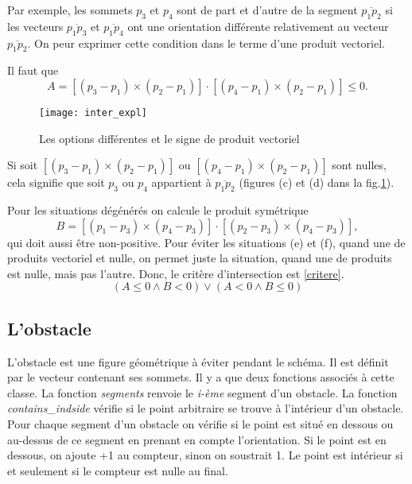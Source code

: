 \documentclass[12pt]{article}
\begin{document}
	Par exemple, les sommets $p_3$ et $p_4$ sont de part et d'autre de la segment $\overline{p_1p_2}$ si les vecteurs  $\overline{p_1p_3}$ et $\overline{p_1p_4}$ ont une orientation différente relativement au vecteur $\overline{p_1p_2}$. On peur exprimer cette condition dans le terme d'une produit vectoriel.
	
	Il faut que 
	\begin{equation}
	A = [(p_3 - p_1) \times (p_2 - p_1)]\cdot[(p_4 - p_1) \times (p_2 - p_1)] \leq 0.
	\end{equation}
	\begin{figure}
		\centering
		\texttt{[image: inter\_expl]}
		\caption{Les options différentes et le signe de produit vectoriel}
		\label{intersect_expl}
	\end{figure}
	
	Si soit  $[(p_3 - p_1) \times (p_2 - p_1)]$ ou $[(p_4 - p_1) \times (p_2 - p_1)]$ sont nulles, cela signifie que soit $p_3$ ou $p_4$ appartient à $\overline{p_1p_2}$ (figures (c) et (d) dans la fig.\ref{intersect_expl}).
	
	Pour les situations dégénérés on calcule le produit symétrique
	\begin{equation}
	B = [(p_1 - p_3) \times (p_4 - p_3)]\cdot[(p_2 - p_3) \times (p_4 - p_3)],
	\end{equation}
	qui doit aussi être non-positive.
	Pour éviter les situations (e) et (f), quand une de produits vectoriel et nulle, on permet juste la situation, quand une de produits est nulle, mais pas l'autre. Donc, le critère d'intersection est \eqref{critere}.
	\begin{equation}
	\label {critere}
	(A \leq 0 \wedge B <0) \vee (A < 0 \wedge B \leq 0) 
	\end{equation}
	\subsection{L'obstacle}
	L'obstacle est une figure géométrique à éviter pendant le schéma. Il est définit par le vecteur contenant ses sommets. Il y a que deux fonctions associés à cette classe. La fonction \textit{segments} renvoie le \textit{i-ème} segment d'un obstacle.
	La fonction \textit{contains\_indside} vérifie si le point arbitraire se trouve à l'intérieur d'un obstacle. Pour chaque segment d'un obstacle on vérifie si le point est situé en dessous ou au-dessus de ce segment en prenant en compte l'orientation. Si le point est en dessous, on ajoute +1 au compteur, sinon on soustrait 1. Le point est intérieur si et seulement si le compteur est nulle au final.
\end{document}
